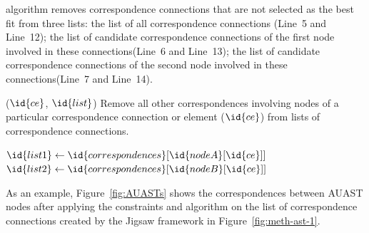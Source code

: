  algorithm removes correspondence connections that are not selected as the best fit from three lists: the list of all correspondence connections (Line~5 and Line~12);
the list of candidate correspondence connections of the first node involved in these connections(Line~6 and Line~13); the list of candidate correspondence connections of the second node involved in these connections(Line~7 and Line~14).

\begin{algorithm}
\caption{($\id{ce}$, $\id{list}$) Remove all other correspondences involving nodes of a particular correspondence connection or element ($\id{ce}$) from lists of correspondence connections.}
\label{removeOtherCEs}
  \begin{algorithmic}[1]
  \RemoveOtherCEs
       \State $\id{list1} \gets \id{correspondences}[\id{nodeA}[\id{ce}]]$
	   \State $\id{list2} \gets \id{correspondences}[\id{nodeB}[\id{ce}]]$
	   		 \EndIf
	   \EndFor		
	 	 	 		 
	   		 \EndIf
	   \EndFor	  	
  \end{algorithmic}
\end{algorithm}

As an example, Figure~\ref{fig:AUASTs} shows the correspondences between AUAST nodes after applying the constraints and  algorithm on the list of correspondence connections created by the Jigsaw framework in Figure~\ref{fig:meth-ast-1}.

